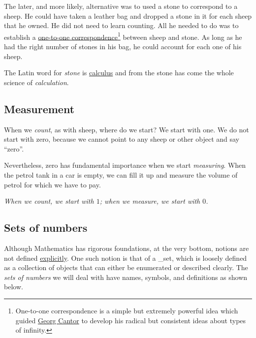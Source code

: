 \documentclass[
  a4paper,
]{article}
\begin{document}
The later, and more likely, alternative was to used a stone to
correspond to a sheep. He could have taken a leather bag and dropped a
stone in it for each sheep that he owned. He did not need to learn
counting. All he needed to do was to establish a
\href{https://www.encyclopedia.com/science/encyclopedias-almanacs-transcripts-and-maps/one-one-correspondence}{one-to-one
correspondence}\footnote{One-to-one correspondence is a simple but
  extremely powerful idea which guided
  \href{https://www.britannica.com/science/one-to-one-correspondence}{Georg
  Cantor} to develop his radical but consistent ideas about types of
  infinity.} between sheep and stone. As long as he had the right number
of stones in his bag, he could account for each one of his sheep.

The Latin word for \emph{stone} is
\href{https://www.etymonline.com/search?q=calculus}{calculus} and from
the stone has come the whole science of \emph{calculation}.

\hypertarget{measurement}{%
\subsection{Measurement}\label{measurement}}

When we \emph{count}, as with sheep, where do we start? We start with
one. We do not start with zero, because we cannot point to any sheep or
other object and say ``zero''.

Nevertheless, zero has fundamental importance when we start
\emph{measuring}. When the petrol tank in a car is empty, we can fill it
up and measure the volume of petrol for which we have to pay.

\emph{When we count, we start with \(1\); when we measure, we start with
\(0\).}

\hypertarget{sets-of-numbers}{%
\subsection{Sets of numbers}\label{sets-of-numbers}}

Although Mathematics has rigorous foundations, at the very bottom,
notions are not defined
\href{https://www.vocabulary.com/dictionary/explicitly}{explicitly}. One
such notion is that of a \_set, which is loosely defined as a collection
of objects that can either be enumerated or described clearly. The
\emph{sets of numbers} we will deal with have names, symbols, and
definitions as shown below.
\end{document}
